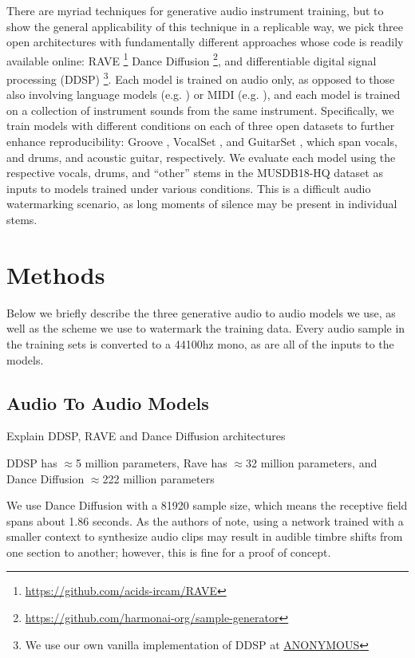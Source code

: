 \documentclass[letterpaper]{article} %
\begin{document}
There are myriad techniques for generative audio instrument training, but to show the general applicability of this technique in a replicable way, we pick three open architectures with fundamentally different approaches whose code is readily available online: RAVE \cite{caillon2021rave}\footnote{ \url{https://github.com/acids-ircam/RAVE} } Dance Diffusion \cite{evans2022dancediffusion} \footnote{ \url{https://github.com/harmonai-org/sample-generator} }, and differentiable digital signal processing (DDSP) \cite{engelddsp}\footnote{We use our own vanilla implementation of DDSP at \url{ANONYMOUS}}.  Each model is trained on audio only, as opposed to those also involving language models (e.g. \cite{evans2024fast}) or MIDI (e.g. \cite{hawthornemulti}), and each model is trained on a collection of instrument sounds from the same instrument.  Specifically, we train models with different conditions on each of three open datasets to further enhance reproducibility: Groove \cite{groove2019}, VocalSet \cite{wilkins2018vocalset}, and GuitarSet \cite{xi2018guitarset}, which span vocals, and drums, and acoustic guitar, respectively.  We evaluate each model using the respective vocals, drums, and ``other'' stems in the MUSDB18-HQ dataset \cite{musdb18-hq} as inputs to models trained under various conditions.  This is a difficult audio watermarking scenario, as long moments of silence may be present in individual stems.




\section{Methods}

Below we briefly describe the three generative audio to audio models we use, as well as the scheme we use to watermark the training data. Every audio sample in the training sets is converted to a 44100hz mono, as are all of the inputs to the models.

\subsection{Audio To Audio Models}

Explain DDSP, RAVE and Dance Diffusion architectures

DDSP has $\approx$5 million parameters, Rave has $\approx$32 million parameters, and Dance Diffusion $\approx$222 million parameters

We use Dance Diffusion with a 81920 sample size, which means the receptive field spans about 1.86 seconds.  As the authors of \cite{hawthornemulti} note, using a network trained with a smaller context to synthesize audio clips may result in audible timbre shifts from one section to another; however, this is fine for a proof of concept.
\end{document}
